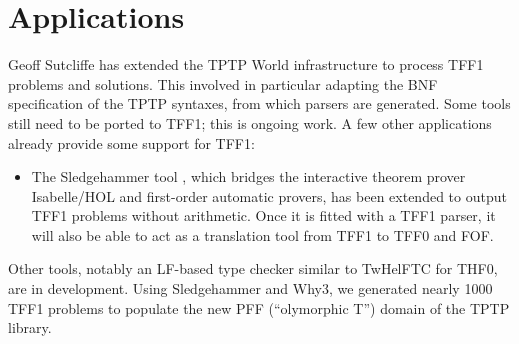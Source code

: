 \section{Applications}
\label{sec_apps}

Geoff Sutcliffe has extended the TPTP World infrastructure to process TFF1
problems and solutions. This involved in particular adapting the BNF
specification of the TPTP syntaxes, from which parsers are generated. Some tools
still need to be ported to TFF1; this is ongoing work.
%
A few other applications already provide some support for TFF1:
%
\begin{itemize}

\item The Sledgehammer tool \cite{paulson-blanchette-2010}, which bridges the
interactive theorem prover Isabelle\slash HOL and first-order automatic provers,
has been extended to output TFF1 problems without arithmetic. Once it is fitted
with a TFF1 parser, it will also be able to act as a translation tool from TFF1
to TFF0 and FOF.


\end{itemize}

Other tools, notably an LF-based type checker similar to TwHelFTC for THF0,
are in development.
%
Using Sledgehammer and Why3, we generated nearly 1000 TFF1 problems to populate
the new PFF (``olymorphic T'') domain of the TPTP library.

%
%
%
%

